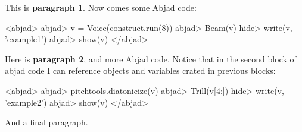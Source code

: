 \documentclass[11pt]{article}
\begin{document}
This is \textbf{paragraph 1}.
Now comes some Abjad code:

<abjad>
   abjad> v = Voice(construct.run(8))
   abjad> Beam(v)
   hide> write(v, 'example1')
   abjad> show(v)
</abjad>

Here is \textbf{paragraph 2}, and more Abjad code. Notice that in the second block of abjad code I can reference objects and variables crated in previous blocks:

<abjad>
   abjad> pitchtools.diatonicize(v)
   abjad> Trill(v[4:])
   hide> write(v, 'example2')
   abjad> show(v)
</abjad>

And a final paragraph.
\end{document}
